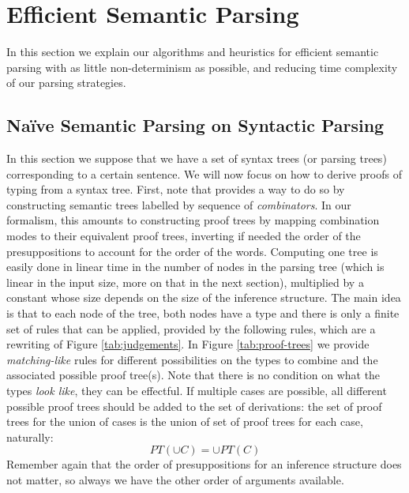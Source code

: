 \section{Efficient Semantic Parsing}
\label{sec:parsing}
In this section we explain our algorithms and heuristics for efficient semantic
parsing with as little non-determinism as possible, and reducing time complexity
of our parsing strategies.

\subsection{Naïve Semantic Parsing on Syntactic Parsing}
In this section we suppose that we have a set of syntax trees (or parsing trees) corresponding to a certain
sentence.
We will now focus on how to derive proofs of typing from a syntax tree.
First, note that \cite{bumfordEffectdrivenInterpretationFunctors2025} provides a way to do so by constructing
semantic trees labelled by sequence of \emph{combinators}.
In our formalism, this amounts to constructing proof trees by mapping combination modes to their equivalent proof
trees, inverting if needed the order of the presuppositions to account for the order of the words.
Computing one tree is easily done in linear time in the number of nodes in the parsing tree (which is linear in the input size,
more on that in the next section), multiplied by a constant whose size depends on the size of the inference
structure.
The main idea is that to each node of the tree, both nodes have a type and there is only a finite set of rules
that can be applied, provided by the following rules, which are a rewriting of Figure \ref{tab:judgements}.
In Figure \ref{tab:proof-trees} we provide \emph{matching-like} rules for different possibilities on the types to
combine and the associated possible proof tree(s).
Note that there is no condition on what the types \emph{look like}, they can be effectful.
If multiple cases are possible, all different possible proof trees should be added to the set of derivations: the
set of proof trees for the union of cases is the union of set of proof trees for each case, naturally:
\begin{equation*}
	PT\left( \cup C \right) = \cup PT(C)
\end{equation*}
Remember again that the order of presuppositions for an inference structure does not matter, so always we have the
other order of arguments available.

\begin{figure*}
	\centering
	
	\caption{List of possible combinations for different presuppositions for inputs, as a definition of a function
		$PT$ from proof trees to proof trees.}
	\label{tab:proof-trees}
\end{figure*}

